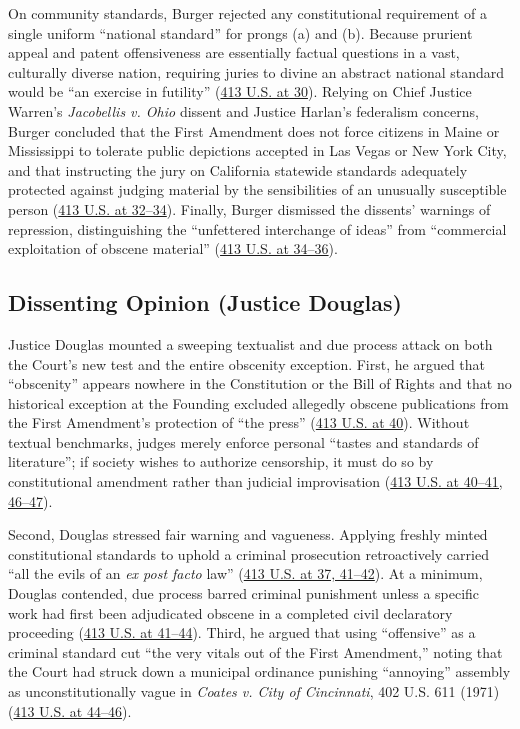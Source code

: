 \documentclass[12pt]{article}
\begin{document}
On community standards, Burger rejected any constitutional requirement of a single uniform ``national standard'' for prongs (a) and (b). Because prurient appeal and patent offensiveness are essentially factual questions in a vast, culturally diverse nation, requiring juries to divine an abstract national standard would be ``an exercise in futility'' (\href{https://supreme.justia.com/cases/federal/us/413/15/}{413 U.S. at 30}). Relying on Chief Justice Warren's \textit{Jacobellis v. Ohio} dissent and Justice Harlan's federalism concerns, Burger concluded that the First Amendment does not force citizens in Maine or Mississippi to tolerate public depictions accepted in Las Vegas or New York City, and that instructing the jury on California statewide standards adequately protected against judging material by the sensibilities of an unusually susceptible person (\href{https://supreme.justia.com/cases/federal/us/413/15/}{413 U.S. at 32--34}). Finally, Burger dismissed the dissents' warnings of repression, distinguishing the ``unfettered interchange of ideas'' from ``commercial exploitation of obscene material'' (\href{https://supreme.justia.com/cases/federal/us/413/15/}{413 U.S. at 34--36}).

\subsection{Dissenting Opinion (Justice Douglas)}
Justice Douglas mounted a sweeping textualist and due process attack on both the Court's new test and the entire obscenity exception. First, he argued that ``obscenity'' appears nowhere in the Constitution or the Bill of Rights and that no historical exception at the Founding excluded allegedly obscene publications from the First Amendment's protection of ``the press'' (\href{https://supreme.justia.com/cases/federal/us/413/15/}{413 U.S. at 40}). Without textual benchmarks, judges merely enforce personal ``tastes and standards of literature''; if society wishes to authorize censorship, it must do so by constitutional amendment rather than judicial improvisation (\href{https://supreme.justia.com/cases/federal/us/413/15/}{413 U.S. at 40--41, 46--47}).

Second, Douglas stressed fair warning and vagueness. Applying freshly minted constitutional standards to uphold a criminal prosecution retroactively carried ``all the evils of an \textit{ex post facto} law'' (\href{https://supreme.justia.com/cases/federal/us/413/15/}{413 U.S. at 37, 41--42}). At a minimum, Douglas contended, due process barred criminal punishment unless a specific work had first been adjudicated obscene in a completed civil declaratory proceeding (\href{https://supreme.justia.com/cases/federal/us/413/15/}{413 U.S. at 41--44}). Third, he argued that using ``offensive'' as a criminal standard cut ``the very vitals out of the First Amendment,'' noting that the Court had struck down a municipal ordinance punishing ``annoying'' assembly as unconstitutionally vague in \textit{Coates v. City of Cincinnati}, 402 U.S. 611 (1971) (\href{https://supreme.justia.com/cases/federal/us/413/15/}{413 U.S. at 44--46}).
\end{document}
